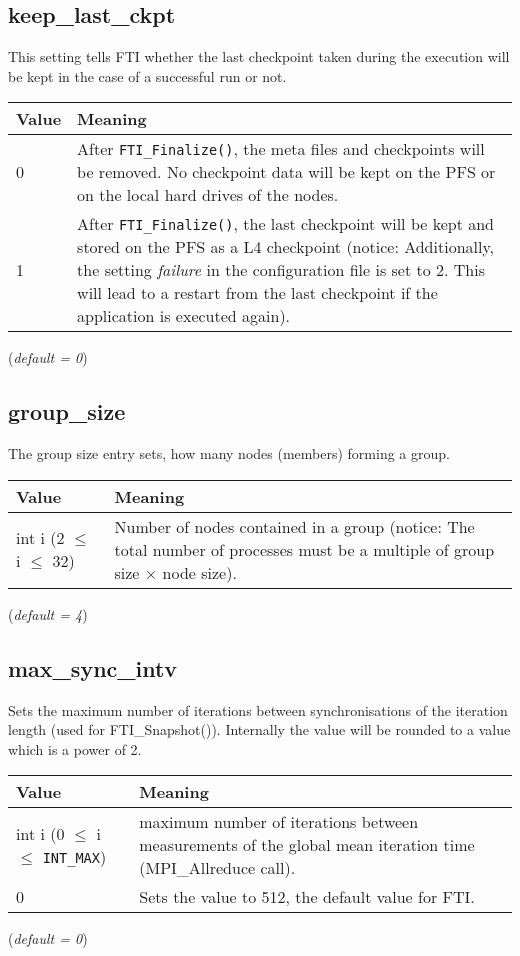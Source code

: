 \documentclass{refrep}
\begin{document}
\subsection{keep\_last\_ckpt}\label{subsec:keeplastckpt}
This setting tells FTI whether the last checkpoint taken during the execution will be kept in the case of a successful run or not.
\begin{center}
\begin{tabular}[h!]{|p{}|p{}|}
\hline
\textbf{Value} & \textbf{Meaning} \\ \hline
0 & After {\tt FTI\_Finalize()}, the meta files and checkpoints will be removed. No checkpoint data will be kept on the PFS or on the local hard drives of the nodes.  \\ \hline
1 & After {\tt FTI\_Finalize()}, the last checkpoint will be kept and stored on the PFS as a L4 checkpoint (notice: Additionally, the setting \emph{failure} in the configuration file is set to 2. This will lead to a restart from the last checkpoint if the application is executed again).  \\ \hline
\end{tabular}
\end{center}
(\textit{default = 0})
\subsection{group\_size}\label{subsec:groupsize}
The group size entry sets, how many nodes (members) forming a group.
\begin{center}
\begin{tabular}[h!]{|p{}|p{}|}
\hline
\textbf{Value} & \textbf{Meaning} \\ \hline
int i (2 $\leq$ i $\leq$ 32) & Number of nodes contained in a group (notice: The total number of processes must be a multiple of group size $\times$ node size). \\ \hline
\end{tabular}
\end{center}
(\textit{default = 4})
\subsection{max\_sync\_intv}\label{subsec:maxsynchintv}
Sets the maximum number of iterations between synchronisations of the iteration length (used for FTI\_Snapshot()). Internally the value will be rounded to a value which is a power of 2.
\begin{center}
\begin{tabular}[h!]{|p{}|p{}|}
\hline
\textbf{Value} & \textbf{Meaning} \\ \hline
    int i (0 $\leq$ i $\leq$ {\tt INT\_MAX}) & maximum number of iterations between measurements of the global mean iteration time (MPI\_Allreduce call).  \\ \hline
    0 & Sets the value to 512, the default value for FTI.  \\ \hline
\end{tabular}
\end{center}
(\textit{default = 0})
\end{document}
